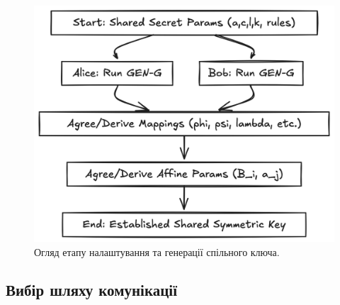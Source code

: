 \begin{figure}[ht]
    \centering
    \includegraphics[width=0.3\textheight,keepaspectratio]{pictures/Setup Phase Overview Diagram}
    \caption{Огляд етапу налаштування та генерації спільного ключа.}
    \label{fig:setup_overview}
\end{figure}

\subsection{Вибір шляху комунікації}
\label{subsec:communication_paths}

